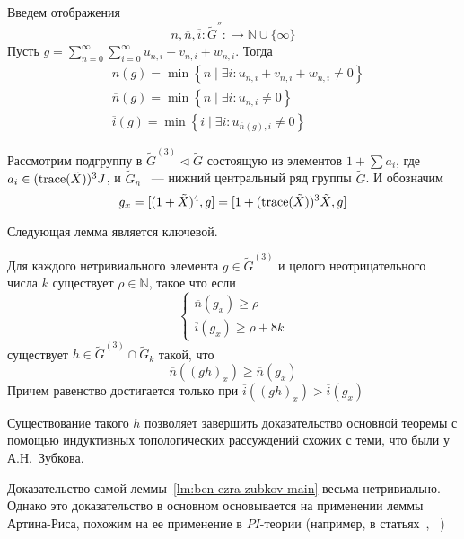 Введем отображения
\[
    n, \overline{n}, \overline{i}: \tilde{G}^{''}: \to \mathbb{N}\cup\{{\infty}\}
\]
Пусть $g = \sum\limits_{n=0}^{\infty}\sum\limits_{i=0}^{\infty}u_{n,i} + v_{n,i} + w_{n,i}$.
Тогда
\begin{align*}
    & n(g) = \min \left\{ n \mid \exists i: u_{n,i} + v_{n,i} + w_{n,i} \neq 0 \right\} \\
    & \overline{n}(g) = \min \left\{  n \mid \exists i: u_{n,i} \neq 0 \right\} \\
    & \overline{i}(g) = \min \left\{  i \mid \exists i: u_{\overline{n}(g),i} \neq 0 \right\}
\end{align*}

Рассмотрим подгруппу в $\tilde{G}^{(3)}\triangleleft\tilde{G}$ состоящую из элементов $1 + \sum a_i$, где $a_i \in (\mathrm{trace}(\tilde{X}))^3 J$, и $\tilde{G}_n$ ~--- нижний центральный ряд группы $\tilde{G}$.
И обозначим \[g_x = [(1 + \tilde{X})^4, g] = [1 + (\mathrm{trace}(\tilde{X}))^3 \tilde{X}, g]\]

Следующая лемма является ключевой.

\begin{lemma}
    \label{lm:ben-ezra-zubkov-main}
    Для каждого нетривиального элемента $g\in \tilde{G}^{(3)}$ и целого неотрицательного числа $k$ существует $\rho \in \mathbb{N}$, такое что если
    \[
        \begin{cases}
            \overline{n}(g_x)\geq \rho \\
            \overline{i}(g_x) \geq \rho + 8k
        \end{cases}
    \]
    существует $h\in \tilde{G}^{(3)}\cap \tilde{G}_k$ такой, что
    \[
        \overline{n}((gh)_x) \geq \overline{n}(g_x)
    \]
    Причем равенство достигается только при $\overline{i}((gh)_x) > \overline{i}(g_x)$
\end{lemma}
\vskip 0.1in\noindent
Существование такого $h$ позволяет завершить доказательство основной теоремы с помощью индуктивных топологических рассуждений схожих с теми, что были у А.Н.\ Зубкова.

Доказательство самой леммы~\ref{lm:ben-ezra-zubkov-main} весьма нетривиально.
Однако это доказательство в основном основывается на применении леммы Артина-Риса, похожим на ее применение в $PI$-теории (например, в статьях~\cite{Kanel}, ~\cite{GrishinSchigolev})
